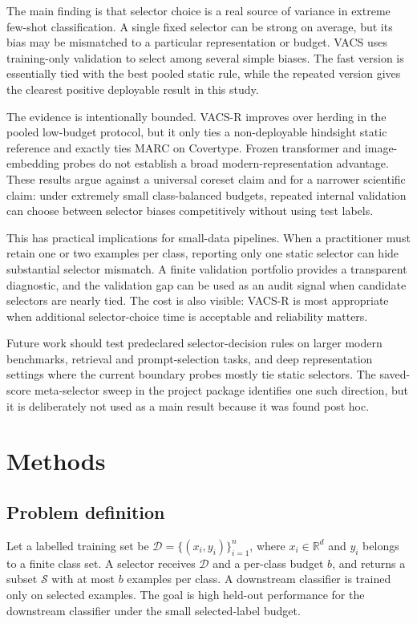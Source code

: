 \documentclass[12pt]{article}
\newcommand{\D}{\mathcal{D}}
\newcommand{\Sset}{\mathcal{S}}
\begin{document}
The main finding is that selector choice is a real source of variance in extreme few-shot classification. A single fixed selector can be strong on average, but its bias may be mismatched to a particular representation or budget. VACS uses training-only validation to select among several simple biases. The fast version is essentially tied with the best pooled static rule, while the repeated version gives the clearest positive deployable result in this study.

The evidence is intentionally bounded. VACS-R improves over herding in the pooled low-budget protocol, but it only ties a non-deployable hindsight static reference and exactly ties MARC on Covertype. Frozen transformer and image-embedding probes do not establish a broad modern-representation advantage. These results argue against a universal coreset claim and for a narrower scientific claim: under extremely small class-balanced budgets, repeated internal validation can choose between selector biases competitively without using test labels.

This has practical implications for small-data pipelines. When a practitioner must retain one or two examples per class, reporting only one static selector can hide substantial selector mismatch. A finite validation portfolio provides a transparent diagnostic, and the validation gap can be used as an audit signal when candidate selectors are nearly tied. The cost is also visible: VACS-R is most appropriate when additional selector-choice time is acceptable and reliability matters.

Future work should test predeclared selector-decision rules on larger modern benchmarks, retrieval and prompt-selection tasks, and deep representation settings where the current boundary probes mostly tie static selectors. The saved-score meta-selector sweep in the project package identifies one such direction, but it is deliberately not used as a main result because it was found post hoc.

\section*{Methods}

\subsection*{Problem definition}

Let a labelled training set be $\D=\{(x_i,y_i)\}_{i=1}^n$, where $x_i \in \mathbb{R}^d$ and $y_i$ belongs to a finite class set. A selector receives $\D$ and a per-class budget $b$, and returns a subset $\Sset$ with at most $b$ examples per class. A downstream classifier is trained only on selected examples. The goal is high held-out performance for the downstream classifier under the small selected-label budget.
\end{document}
